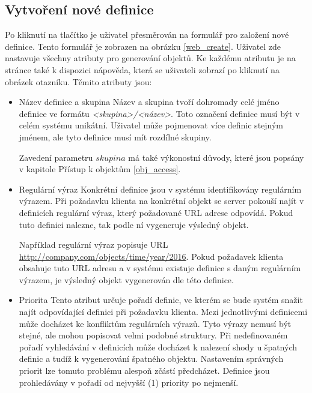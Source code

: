 \documentclass[thesis=B,czech]{FITthesis}[2012/06/26]
\begin{document}
    \subsection{Vytvoření nové definice}
    Po kliknutí na tlačítko  je uživatel přesměrován na formulář pro založení nové definice. Tento formulář je zobrazen na obrázku
    \ref{web_create}.
    Uživatel zde nastavuje všechny atributy pro generování objektů.
    Ke každému atributu je na stránce také k dispozici nápověda, která se uživateli zobrazí po kliknutí na obrázek otazníku.
    Těmito atributy jsou:
    \begin{itemize}
     \item Název definice a skupina
      \subitem Název a skupina tvoří dohromady celé jméno definice ve formátu \textit{<skupina>/<název>}. Toto označení definice musí být v celém systému 
      unikátní. Uživatel může pojmenovat více definic stejným jménem, ale tyto definice musí mít rozdílné skupiny.
      
      Zavedení parametru $skupina$ má také výkonostní důvody, které jsou popsány v kapitole Přístup k objektům \ref{obj_access}.
      
      \item Regulární výraz
	\subitem Konkrétní definice jsou v systému identifikovány regulárním výrazem. Při požadavku klienta na konkrétní objekt se server pokouší najít v 
	definicích regulární výraz, který požadované URL adrese odpovídá. Pokud tuto definici nalezne, tak podle ní vygeneruje výsledný objekt.
	
	Například regulární výraz  popisuje URL \url{http://company.com/objects/time/year/2016}.
	Pokud požadavek klienta obsahuje tuto URL adresu a v systému existuje definice s daným regulárním výrazem, je výsledný objekt vygenerován
	dle této definice.
	
	
      \item Priorita
	\subitem Tento atribut určuje pořadí definic, ve kterém se bude systém snažit najít odpovídající definici při požadavku klienta. 
	Mezi jednotlivými definicemi může docházet ke konfliktům regulárních výrazů. Tyto výrazy nemusí být stejné, ale mohou popisovat velmi podobné struktury.
	Při nedefinovaném pořadí vyhledávání v definicích může docházet k nalezení shody u špatných definic a tudíž k vygenerování špatného objektu.
	Nastavením správných priorit lze tomuto problému alespoň zčástí předcházet. Definice jsou prohledávány v pořadí od nejvyšší (1) priority po nejmenší.
	

\end{itemize}
\end{document}
